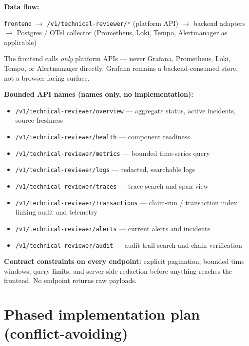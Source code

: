 \documentclass[11pt]{article}
\newcommand{\code}[1]{\texttt{#1}}
\begin{document}
\textbf{Data flow:}
\begin{center}
\small
\code{frontend} $\to$ \code{/v1/technical-reviewer/*} (platform API) $\to$
backend adapters $\to$ Postgres / OTel collector (Prometheus, Loki, Tempo,
Alertmanager as applicable)
\end{center}
The frontend calls \emph{only} platform APIs --- never Grafana, Prometheus,
Loki, Tempo, or Alertmanager directly. Grafana remains a backend-consumed
store, not a browser-facing surface.

\textbf{Bounded API names (names only, no implementation):}
\begin{itemize}
\item \code{/v1/technical-reviewer/overview} --- aggregate status, active
      incidents, source freshness
\item \code{/v1/technical-reviewer/health} --- component readiness
\item \code{/v1/technical-reviewer/metrics} --- bounded time-series query
\item \code{/v1/technical-reviewer/logs} --- redacted, searchable logs
\item \code{/v1/technical-reviewer/traces} --- trace search and span view
\item \code{/v1/technical-reviewer/transactions} --- claim-run / transaction
      index linking audit and telemetry
\item \code{/v1/technical-reviewer/alerts} --- current alerts and incidents
\item \code{/v1/technical-reviewer/audit} --- audit trail search and chain
      verification
\end{itemize}

\textbf{Contract constraints on every endpoint:} explicit pagination, bounded
time windows, query limits, and server-side redaction before anything reaches
the frontend. No endpoint returns raw payloads.

\section{Phased implementation plan (conflict-avoiding)}
\end{document}
